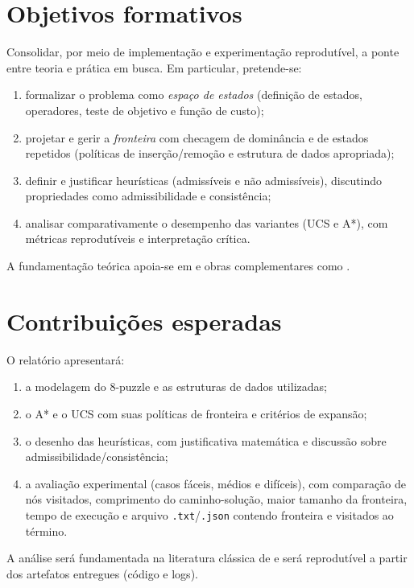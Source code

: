 \section{Objetivos formativos}
Consolidar, por meio de implementação e experimentação reprodutível, a ponte entre teoria e prática em busca. Em particular, pretende-se:
\begin{enumerate}[label=(\alph*),leftmargin=*,itemsep=0pt,topsep=2pt]
  \item formalizar o problema como \emph{espaço de estados} (definição de estados, operadores, teste de objetivo e função de custo);
  \item projetar e gerir a \emph{fronteira} com checagem de dominância e de estados repetidos (políticas de inserção/remoção e estrutura de dados apropriada);
  \item definir e justificar heurísticas (admissíveis e não admissíveis), discutindo propriedades como admissibilidade e consistência;
  \item analisar comparativamente o desempenho das variantes (UCS e A*), com métricas reprodutíveis e interpretação crítica.
\end{enumerate}
A fundamentação teórica apoia-se em  e obras complementares como .


\section{Contribuições esperadas}
O relatório apresentará:
\begin{enumerate}[label=(\roman*),leftmargin=*,itemsep=0pt,topsep=2pt]
  \item a modelagem do 8-puzzle e as estruturas de dados utilizadas;
  \item o A* e o UCS com suas políticas de fronteira e critérios de expansão;
  \item o desenho das heurísticas, com justificativa matemática e discussão sobre admissibilidade/consistência;
  \item a avaliação experimental (casos fáceis, médios e difíceis), com comparação de nós visitados, comprimento do caminho-solução, maior tamanho da fronteira, tempo de execução e arquivo \texttt{.txt}/\texttt{.json} contendo fronteira e visitados ao término.
\end{enumerate}
A análise será fundamentada na literatura clássica de  e será reprodutível a partir dos artefatos entregues (código e logs).

